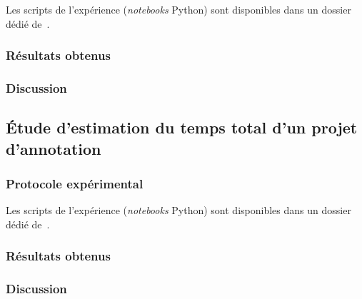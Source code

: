 			\begin{leftBarInformation}
				Les scripts de l'expérience (\textit{notebooks} Python) sont disponibles dans un dossier dédié de~\cite{schild:cognitivefactory-interactive-clustering-comparative-study:2021}.
			\end{leftBarInformation}

		\subsubsection{Résultats obtenus}

		\subsubsection{Discussion}
	
	\subsection{Étude d'estimation du temps total d'un projet d'annotation}
	\label{section:4.3.4-ETUDE-COUTS-TOTAL}
	
		\subsubsection{Protocole expérimental}
		

			\begin{leftBarInformation}
				Les scripts de l'expérience (\textit{notebooks} Python) sont disponibles dans un dossier dédié de~\cite{schild:cognitivefactory-interactive-clustering-comparative-study:2021}.
			\end{leftBarInformation}

		\subsubsection{Résultats obtenus}

		\subsubsection{Discussion}